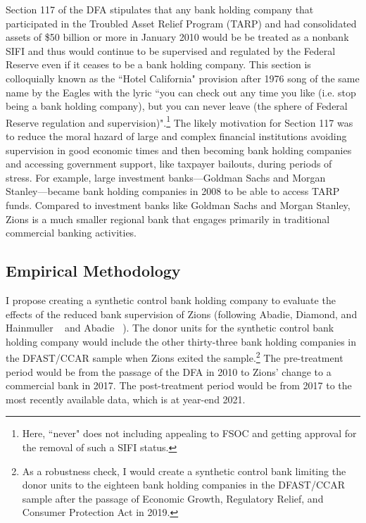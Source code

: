 \documentclass[12pt]{article}
\begin{document}
Section 117 of the DFA stipulates that any bank holding company that participated in the Troubled Asset Relief Program (TARP) and had consolidated assets  of \$50 billion or more in January 2010 would be be treated as a nonbank SIFI and thus would continue to be supervised and regulated by the Federal Reserve even if it ceases to be a bank holding company.  This section is colloquially known as the ``Hotel California" provision after 1976 song of the same name by the Eagles with the lyric ``you can check out any time you like (i.e. stop being a bank holding company), but you can never leave (the sphere of Federal Reserve regulation and supervision)".\footnote{Here, ``never" does not including appealing to FSOC and getting approval for the removal of such a SIFI status.} The likely motivation for Section 117 was to reduce the moral hazard of large and complex financial institutions avoiding supervision in good economic times and then becoming bank holding companies and accessing government support, like taxpayer bailouts, during periods of stress.  For example, large investment banks---Goldman Sachs and Morgan Stanley---became bank holding companies in 2008 to be able to access TARP funds.  Compared to investment banks like Goldman Sachs and Morgan Stanley, Zions is a much smaller regional bank that engages primarily in traditional commercial banking activities.

\subsection{Empirical Methodology}

I propose creating a synthetic control bank holding company to evaluate the effects of the reduced bank supervision of Zions (following Abadie, Diamond, and Hainmuller ~\cite{adh2010} and Abadie ~\cite{abadie2021}). The donor units for the synthetic control bank holding company would include the other thirty-three bank holding companies in the DFAST/CCAR sample when Zions exited the sample.\footnote{As a robustness check, I would create a synthetic control bank limiting the donor units to the eighteen bank holding companies in the DFAST/CCAR sample after the passage of Economic Growth, Regulatory Relief, and Consumer Protection Act in 2019.} The pre-treatment period would be from the passage of the DFA in 2010 to Zions' change to a commercial bank in 2017. The post-treatment period would be from 2017 to the most recently available data, which is at year-end 2021. 
\end{document}

